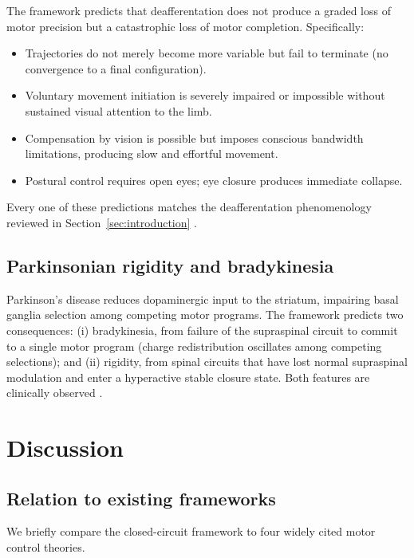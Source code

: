 \documentclass[11pt,twocolumn,a4paper]{article}
\theoremstyle{definition}
\theoremstyle{remark}
\begin{document}
The framework predicts that deafferentation does not produce a graded
loss of motor precision but a catastrophic loss of motor completion.
Specifically:
\begin{itemize}[leftmargin=*,itemsep=1pt]
\item Trajectories do not merely become more variable but fail to
terminate (no convergence to a final configuration).
\item Voluntary movement initiation is severely impaired or impossible
without sustained visual attention to the limb.
\item Compensation by vision is possible but imposes conscious
bandwidth limitations, producing slow and effortful movement.
\item Postural control requires open eyes; eye closure produces
immediate collapse.
\end{itemize}
Every one of these predictions matches the deafferentation
phenomenology reviewed in Section~\ref{sec:introduction}
\citep{cole1991,sainburg1995,ghez1995,lajoie1996}.

\subsection{Parkinsonian rigidity and bradykinesia}

Parkinson's disease reduces dopaminergic input to the striatum,
impairing basal ganglia selection among competing motor programs. The
framework predicts two consequences: (i) bradykinesia, from failure
of the supraspinal circuit to commit to a single motor program
(charge redistribution oscillates among competing selections); and
(ii) rigidity, from spinal circuits that have lost normal supraspinal
modulation and enter a hyperactive stable closure state. Both features
are clinically observed \citep{hallett1993}.


\section{Discussion}
\label{sec:discussion}

\subsection{Relation to existing frameworks}

We briefly compare the closed-circuit framework to four widely cited
motor control theories.
\end{document}
